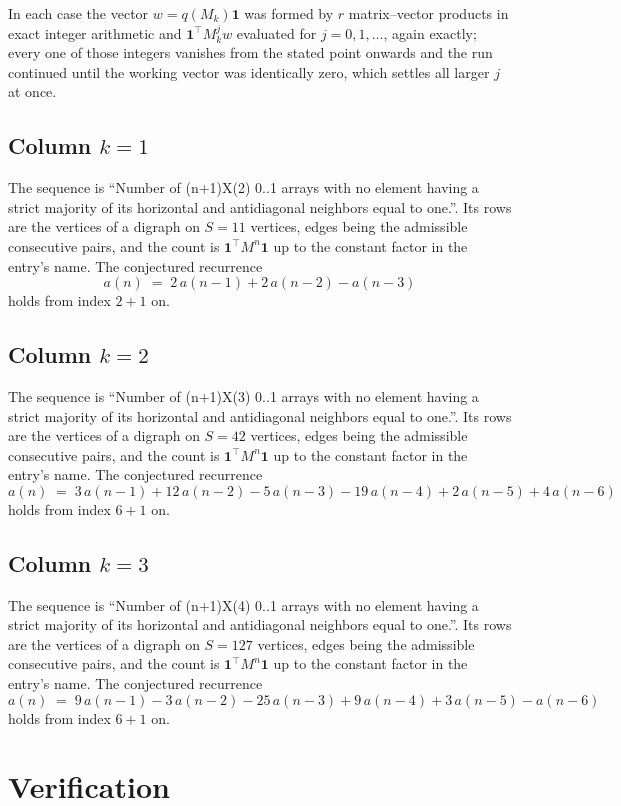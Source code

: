 \documentclass[11pt,a4paper]{article}
\theoremstyle{plain}
\theoremstyle{definition}
\begin{document}
In each case the vector $w=q(M_k)\mathbf{1}$ was formed by $r$ matrix--vector products in
exact integer arithmetic and $\mathbf{1}^{\!\top}M_k^{j}w$ evaluated for $j=0,1,\dots$,
again exactly; every one of those integers vanishes from the stated point onwards and the run
continued until the working vector was identically zero, which settles all larger $j$ at once.

\subsection*{Column $k$$=1$}
The sequence is ``Number of (n+1)X(2) 0..1 arrays with no element having a strict majority of its horizontal and antidiagonal neighbors equal to one.''. Its rows are the vertices of a digraph on
$S=11$ vertices, edges being the admissible consecutive pairs, and the count is
$\mathbf{1}^{\!\top}M^{n}\mathbf{1}$ up to the constant factor in the entry's name.
The conjectured recurrence
\[
a(n)\;=\;2\,a(n-1) + 2\,a(n-2) - a(n-3)
\]
holds from index $2+1$ on.

\subsection*{Column $k$$=2$}
The sequence is ``Number of (n+1)X(3) 0..1 arrays with no element having a strict majority of its horizontal and antidiagonal neighbors equal to one.''. Its rows are the vertices of a digraph on
$S=42$ vertices, edges being the admissible consecutive pairs, and the count is
$\mathbf{1}^{\!\top}M^{n}\mathbf{1}$ up to the constant factor in the entry's name.
The conjectured recurrence
\[
a(n)\;=\;3\,a(n-1) + 12\,a(n-2) - 5\,a(n-3) - 19\,a(n-4) + 2\,a(n-5) + 4\,a(n-6)
\]
holds from index $6+1$ on.

\subsection*{Column $k$$=3$}
The sequence is ``Number of (n+1)X(4) 0..1 arrays with no element having a strict majority of its horizontal and antidiagonal neighbors equal to one.''. Its rows are the vertices of a digraph on
$S=127$ vertices, edges being the admissible consecutive pairs, and the count is
$\mathbf{1}^{\!\top}M^{n}\mathbf{1}$ up to the constant factor in the entry's name.
The conjectured recurrence
\[
a(n)\;=\;9\,a(n-1) - 3\,a(n-2) - 25\,a(n-3) + 9\,a(n-4) + 3\,a(n-5) - a(n-6)
\]
holds from index $6+1$ on.

\section{Verification}
\end{document}
